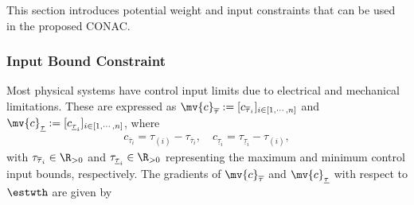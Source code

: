 \documentclass[lettersize,journal]{IEEEtran}
\begin{document}
This section introduces potential weight and input constraints that can be used in the proposed CONAC. 

\subsubsection{Input Bound Constraint}\label{sec:appen:cstr:input:bound}

Most physical systems have control input limits due to electrical and mechanical limitations. These are expressed as $\mv{c}_{\overline \tau}:= [c_{\overline \tau_i}]_{i\in[1,\cdots,n]}$ and $\mv{c}_{\underline\tau}:= [c_{\underline\tau_i}]_{i\in[1,\cdots,n]}$, where
\begin{equation}
    \begin{aligned}
        c_{\overline \tau_i}=\tau_{(i)} - {\tau_{\overline \tau_i}}
        ,
        \quad
        c_{\underline\tau_i}={\tau_{\underline\tau_i}}-\tau_{(i)}
        ,
    \end{aligned}
    \label{eq:cstr:input:bound}
\end{equation}
with $\tau_{\overline \tau_i}\in\R_{>0}$ and $\tau_{\underline\tau_i}\in\R_{>0}$ representing the maximum and minimum control input bounds, respectively.
The gradients of $\mv{c}_{\overline \tau}$ and $\mv{c}_{\underline\tau}$ with respect to $\estwth$ are given by
\end{document}
